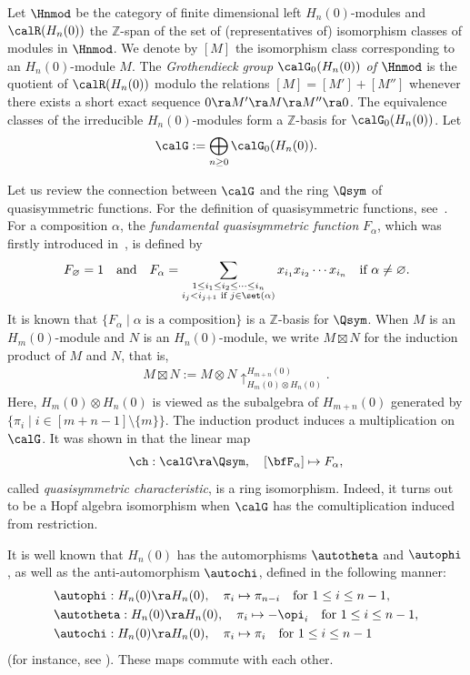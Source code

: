 \documentclass[12pt, reqno]{amsart}
\theoremstyle{definition}
\numberwithin{equation}{section} \numberwithin{figure}{section}
\numberwithin{table}{section}
\def\Z{\mathbb Z}
\begin{document}
Let $\Hnmod$ be the category of finite dimensional left $H_n(0)$-modules and $\calR(H_n(0))$ the $\Z$-span of the set of (representatives of) isomorphism classes of modules in $\Hnmod$.
We denote by $[M]$ the isomorphism class corresponding to an $H_n(0)$-module $M$. 
The \emph{Grothendieck group $\calG_0(H_n(0))$ of $\Hnmod$} is the quotient of $\calR(H_n(0))$ modulo the relations $[M] = [M'] + [M'']$ whenever there exists a short exact sequence $0 \ra M' \ra M \ra M'' \ra 0$. 
The equivalence classes of the irreducible $H_n(0)$-modules form a $\Z$-basis for $\calG_0(H_n(0))$. Let
\[
\calG := \bigoplus_{n \ge 0} \calG_0(H_n(0)).
\]

Let us review the connection between $\calG$ and the ring $\Qsym$ of quasisymmetric functions.
For the definition of quasisymmetric functions, see~\cite[Section 7.19]{99Stanley}.
For a composition $\alpha$, the \emph{fundamental quasisymmetric function} $F_\alpha$, which was firstly introduced in~\cite{84Gessel}, is defined by
\[
F_\varnothing = 1 
\quad \text{and} \quad
F_\alpha = \sum_{\substack{1 \le i_1 \le i_2 \le \cdots \le i_n \\ i_j < i_{j+1} \text{ if } j \in \set(\alpha)}} x_{i_1}x_{i_2} \cdots x_{i_n} \quad \text{if $\alpha \neq \varnothing$}.
\]
It is known that $\{F_\alpha \mid \text{$\alpha$ is a composition}\}$ is a $\mathbb Z$-basis for $\Qsym$.
When $M$ is an $H_m(0)$-module and $N$ is
an $H_n(0)$-module, we write $M \boxtimes N$ for the induction product of $M$ and $N$, that is,
\begin{align*}
M \boxtimes N := M \otimes N \uparrow_{H_m(0) \otimes H_n(0)}^{H_{m+n}(0)}.
\end{align*}
Here, $H_m(0) \otimes H_n(0)$ is viewed as the subalgebra of $H_{m+n}(0)$ generated by $\{\pi_i \mid i \in [m+n-1] \setminus \{m\} \}$.
The induction product induces a multiplication on $\calG$.
It was shown in \cite{96DKLT} that the linear map
\begin{equation*}\label{quasi characteristic}
\ch : \calG \ra \Qsym, \quad [\bfF_{\alpha}] \mapsto F_{\alpha},
\end{equation*}
called \emph{quasisymmetric characteristic}, is a ring isomorphism.
Indeed, it turns out to be a Hopf algebra isomorphism when $\calG$ has the comultiplication induced from restriction. 

It is well known that $H_n(0)$ has the automorphisms $\autotheta$ and $\autophi$, as well as the anti-automorphism $\autochi$, defined in the following manner:
\begin{align*}
&\autophi: H_n(0) \ra H_n(0), \quad \pi_i \mapsto \pi_{n-i} \quad \text{for $1 \le i \le n-1$},\\
&\autotheta: H_n(0) \ra H_n(0), \quad \pi_i \mapsto - \opi_i \quad \text{for $1 \le i \le n-1$}, \\
&\autochi: H_n(0) \ra H_n(0), \quad \pi_i \mapsto \pi_i \quad \text{for $1 \le i \le n-1$}
\end{align*}
(for instance, see \cite{05Fayers, 97KT, 97LLT, 84LS}).
These maps commute with each other.
\end{document}
